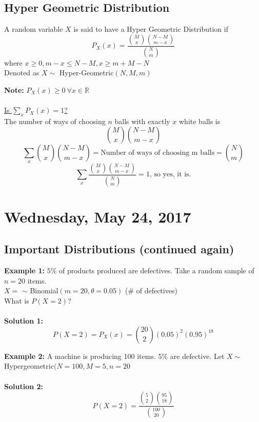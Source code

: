 \documentclass[12pt, twoside]{article}
\begin{document}
\subsection{Hyper Geometric Distribution}
\begin{tcolorbox}[title=Definition: Hyper Geometric Distribution]
	A random variable $X$ is said to have a Hyper Geometric Distribution if
	$$P_X (x) = \frac{\binom{M}{x} \binom{N-M}{m-x}}{\binom{N}{m}}$$
	where $x \geq 0, m-x \leq N-M, x \geq m + M - N$\\
	Denoted as $X\sim$ Hyper-Geometric$(N,M,m)$
\end{tcolorbox}

\textbf{Note: } $P_X (x) \geq 0 \: \forall x\in\mathbb{R}$\\
\\
\underline{Is $\sum_x P_X (x) = 1$?}\\
The number of ways of choosing $n$ balls with exactly $x$ white balls is
$$\binom{M}{x}\binom{N-M}{m-x}$$
$$\sum_x \binom{M}{x}\binom{N-M}{m-x} = \text{Number of ways of choosing m balls} = \binom{N}{m}$$
$$\sum_x \frac{\binom{M}{x}\binom{N-M}{m-x}}{\binom{N}{m}} = 1 \text{, so yes, it is.}$$



\newpage

\section{Wednesday, May 24, 2017}

\subsection{Important Distributions (continued again)}

\textbf{Example 1:} $5\%$ of products produced are defectives. Take a random sample of $n = 20$ items.\\
$X = $ $\sim$ Binomial$(m = 20, \theta = 0.05)$  (\# of defectives)\\
What is $P(X = 2)$?\\
\\
\textbf{Solution 1:} $$P(X = 2) = P_X (x) = \binom{20}{2} (0.05)^2 (0.95)^{18}$$

\textbf{Example 2:} A machine is producing 100 items. $5\%$ are defective. Let $X \sim $ Hypergeometric$(N = 100, M = 5, n = 20$\\
\\
\textbf{Solution 2:} $$P(X = 2) = \frac{\binom{5}{2} \binom{95}{18}}{ \binom{100}{20}}$$
\end{document}
